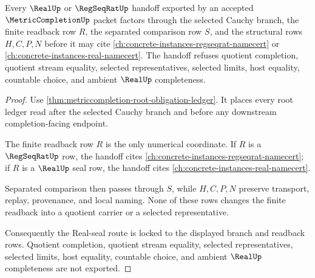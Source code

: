 \begin{theorem}
\label{thm:metriccompletion-real-seal-scope-lock}
Every $\RealUp$ or $\RegSeqRatUp$ handoff exported by an accepted $\MetricCompletionUp$ packet factors through the selected Cauchy branch, the finite readback row $R$, the separated comparison row $S$, and the structural rows $H,C,P,N$ before it may cite \autoref{ch:concrete-instances-regseqrat-namecert} or \autoref{ch:concrete-instances-real-namecert}. The handoff refuses quotient completion, quotient stream equality, selected representatives, selected limits, host equality, countable choice, and ambient $\RealUp$ completeness.
\end{theorem}
\begin{proof}
Use \autoref{thm:metriccompletion-root-obligation-ledger}. It places every root ledger read after the selected Cauchy branch and before any downstream completion-facing endpoint.

The finite readback row $R$ is the only numerical coordinate. If $R$ is a $\RegSeqRatUp$ row, the handoff cites \autoref{ch:concrete-instances-regseqrat-namecert}; if $R$ is a $\RealUp$ seal row, the handoff cites \autoref{ch:concrete-instances-real-namecert}.

Separated comparison then passes through $S$, while $H,C,P,N$ preserve transport, replay, provenance, and local naming. None of these rows changes the finite readback into a quotient carrier or a selected representative.

Consequently the Real-seal route is locked to the displayed branch and readback rows. Quotient completion, quotient stream equality, selected representatives, selected limits, host equality, countable choice, and ambient $\RealUp$ completeness are not exported.
\end{proof}

